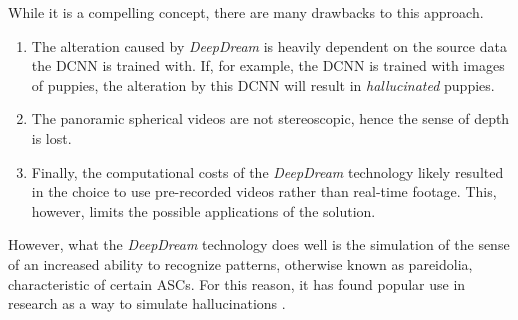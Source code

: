 While it is a compelling concept, there are many drawbacks to this approach.

\begin{enumerate}
    \item The alteration caused by \textit{DeepDream} is heavily dependent on the source data the \ac{DCNN} is trained with. If, for example, the \ac{DCNN} is trained with images of puppies, the alteration by this \ac{DCNN} will result in \textit{hallucinated} puppies.
    \item The panoramic spherical videos are not stereoscopic, hence the sense of depth is lost.
    \item Finally, the computational costs of the \textit{DeepDream} technology likely resulted in the choice to use pre-recorded videos rather than real-time footage. This, however, limits the possible applications of the solution.
\end{enumerate}

However, what the \textit{DeepDream} technology does well is the simulation of the sense of an increased ability to recognize patterns, otherwise known as pareidolia, characteristic of certain \acp{ASC}. For this reason, it has found popular use in research as a way to simulate hallucinations \autocites{greco2021increased}{rastelli2021simulated}.

